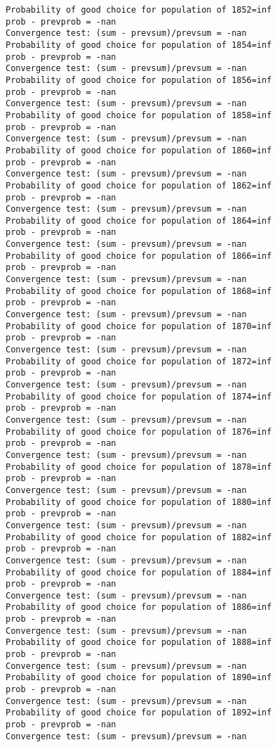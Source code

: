 \documentclass[11pt,onecolumn]{article}
\begin{document}
\begin{verbatim}
Probability of good choice for population of 1852=inf
prob - prevprob = -nan
Convergence test: (sum - prevsum)/prevsum = -nan
Probability of good choice for population of 1854=inf
prob - prevprob = -nan
Convergence test: (sum - prevsum)/prevsum = -nan
Probability of good choice for population of 1856=inf
prob - prevprob = -nan
Convergence test: (sum - prevsum)/prevsum = -nan
Probability of good choice for population of 1858=inf
prob - prevprob = -nan
Convergence test: (sum - prevsum)/prevsum = -nan
Probability of good choice for population of 1860=inf
prob - prevprob = -nan
Convergence test: (sum - prevsum)/prevsum = -nan
Probability of good choice for population of 1862=inf
prob - prevprob = -nan
Convergence test: (sum - prevsum)/prevsum = -nan
Probability of good choice for population of 1864=inf
prob - prevprob = -nan
Convergence test: (sum - prevsum)/prevsum = -nan
Probability of good choice for population of 1866=inf
prob - prevprob = -nan
Convergence test: (sum - prevsum)/prevsum = -nan
Probability of good choice for population of 1868=inf
prob - prevprob = -nan
Convergence test: (sum - prevsum)/prevsum = -nan
Probability of good choice for population of 1870=inf
prob - prevprob = -nan
Convergence test: (sum - prevsum)/prevsum = -nan
Probability of good choice for population of 1872=inf
prob - prevprob = -nan
Convergence test: (sum - prevsum)/prevsum = -nan
Probability of good choice for population of 1874=inf
prob - prevprob = -nan
Convergence test: (sum - prevsum)/prevsum = -nan
Probability of good choice for population of 1876=inf
prob - prevprob = -nan
Convergence test: (sum - prevsum)/prevsum = -nan
Probability of good choice for population of 1878=inf
prob - prevprob = -nan
Convergence test: (sum - prevsum)/prevsum = -nan
Probability of good choice for population of 1880=inf
prob - prevprob = -nan
Convergence test: (sum - prevsum)/prevsum = -nan
Probability of good choice for population of 1882=inf
prob - prevprob = -nan
Convergence test: (sum - prevsum)/prevsum = -nan
Probability of good choice for population of 1884=inf
prob - prevprob = -nan
Convergence test: (sum - prevsum)/prevsum = -nan
Probability of good choice for population of 1886=inf
prob - prevprob = -nan
Convergence test: (sum - prevsum)/prevsum = -nan
Probability of good choice for population of 1888=inf
prob - prevprob = -nan
Convergence test: (sum - prevsum)/prevsum = -nan
Probability of good choice for population of 1890=inf
prob - prevprob = -nan
Convergence test: (sum - prevsum)/prevsum = -nan
Probability of good choice for population of 1892=inf
prob - prevprob = -nan
Convergence test: (sum - prevsum)/prevsum = -nan

\end{verbatim}
\end{document}
